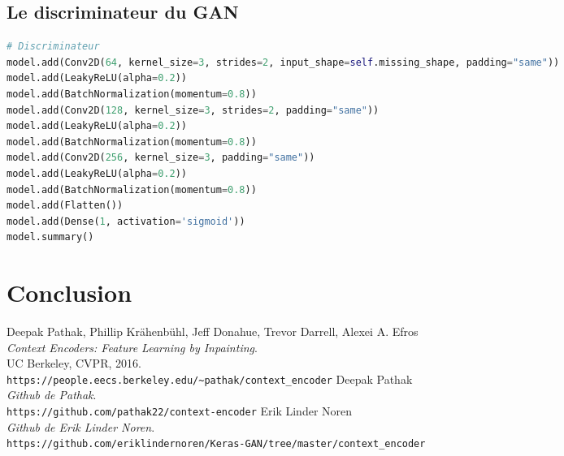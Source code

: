 \documentclass[11pt,a4paper]{article}
\begin{document}
        \subsection{Le discriminateur du GAN}              
            \begin{lstlisting}[language=Python, caption=Code Python du discriminateur]
# Discriminateur
model.add(Conv2D(64, kernel_size=3, strides=2, input_shape=self.missing_shape, padding="same"))
model.add(LeakyReLU(alpha=0.2))
model.add(BatchNormalization(momentum=0.8))
model.add(Conv2D(128, kernel_size=3, strides=2, padding="same"))
model.add(LeakyReLU(alpha=0.2))
model.add(BatchNormalization(momentum=0.8))
model.add(Conv2D(256, kernel_size=3, padding="same"))
model.add(LeakyReLU(alpha=0.2))
model.add(BatchNormalization(momentum=0.8))
model.add(Flatten())
model.add(Dense(1, activation='sigmoid'))
model.summary()\end{lstlisting}

    \section{Conclusion}


    \newpage
    \listoffigures
    \newpage



    \begin{thebibliography}{9}
            Deepak Pathak, Phillip Krähenbühl, Jeff Donahue, Trevor Darrell, Alexei A. Efros\\
            \textit{Context Encoders: Feature Learning by Inpainting}.\\
            UC Berkeley, CVPR, 2016.
            \\\texttt{https://people.eecs.berkeley.edu/\~{}pathak/context\_encoder}
            Deepak Pathak\\
            \textit{Github de Pathak}.
            \\\texttt{https://github.com/pathak22/context-encoder}
            Erik Linder Noren\\
            \textit{Github de Erik Linder Noren}.
            \\\texttt{https://github.com/eriklindernoren/Keras-GAN/tree/master/context\_encoder}
    \end{thebibliography}
\end{document}
